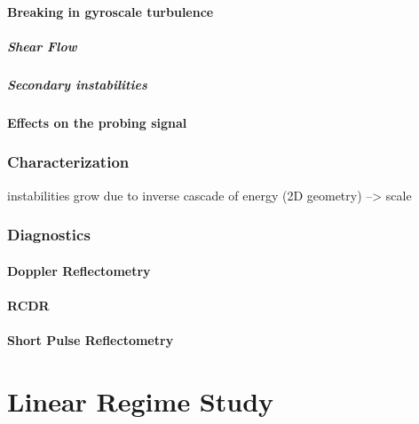 \documentclass[11pt,a4paper]{report}
\begin{document}
\begin{multicols}{2}
    \subsubsection{Breaking in gyroscale turbulence}
    \paragraph{Shear Flow}
    \paragraph{Secondary instabilities}
    \subsubsection{Effects on the probing signal}
    \subsection{Characterization}
    instabilities grow due to inverse cascade of energy (2D geometry) --> scale
    \subsection{Diagnostics}
    \subsubsection{Doppler Reflectometry}

    \subsubsection{RCDR}

    \subsubsection{Short Pulse Reflectometry}

    \chapter{Linear Regime Study}


\end{multicols}
\end{document}
